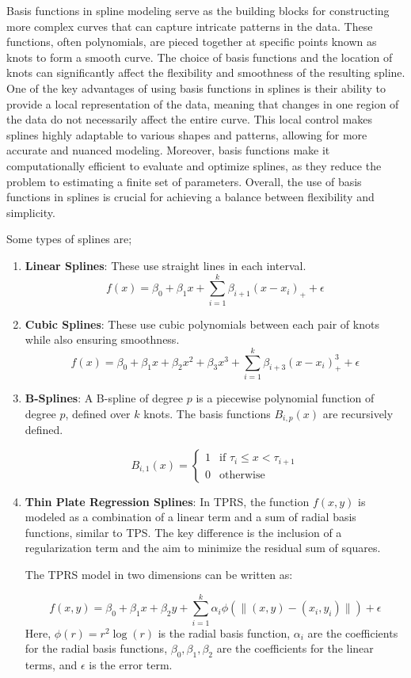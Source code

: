 \documentclass[12pt, twoside,hidelinks]{article}
\theoremstyle{definition}
\numberwithin{equation}{section}
\begin{document}
Basis functions in spline modeling serve as the building blocks for constructing more complex curves that can capture intricate patterns in the data. These functions, often polynomials, are pieced together at specific points known as knots to form a smooth curve. The choice of basis functions and the location of knots can significantly affect the flexibility and smoothness of the resulting spline. One of the key advantages of using basis functions in splines is their ability to provide a local representation of the data, meaning that changes in one region of the data do not necessarily affect the entire curve. This local control makes splines highly adaptable to various shapes and patterns, allowing for more accurate and nuanced modeling. Moreover, basis functions make it computationally efficient to evaluate and optimize splines, as they reduce the problem to estimating a finite set of parameters. Overall, the use of basis functions in splines is crucial for achieving a balance between flexibility and simplicity.
\newline

Some types of splines are;

\begin{enumerate}
    \item \textbf{Linear Splines}: These use straight lines in each interval.
    \[
    f(x) = \beta_0 + \beta_1 x + \sum_{i=1}^{k} \beta_{i+1} (x - x_i)_+ + \epsilon
    \]
    
    \item \textbf{Cubic Splines}: These use cubic polynomials between each pair of knots while also ensuring smoothness.
    \[
    f(x) = \beta_0 + \beta_1 x + \beta_2 x^2 + \beta_3 x^3 + \sum_{i=1}^{k} \beta_{i+3} (x - x_i)_+^3 + \epsilon
    \]

    \item \textbf{B-Splines}:
    A B-spline of degree \( p \) is a piecewise polynomial function of degree \( p \), defined over \( k \) knots. The basis functions \( B_{i,p}(x) \) are recursively defined.

    \[
    B_{i,1}(x) = 
    \begin{cases} 
    1 & \text{if } \tau_i \leq x < \tau_{i+1} \\
    0 & \text{otherwise}
    \end{cases}
    \]
    \item \textbf{Thin Plate Regression Splines}:
    In TPRS, the function \( f(x, y) \) is modeled as a combination of a linear term and a sum of radial basis functions, similar to TPS. The key difference is the inclusion of a regularization term and the aim to minimize the residual sum of squares.


The TPRS model in two dimensions can be written as:

\[
f(x, y) = \beta_0 + \beta_1 x + \beta_2 y + \sum_{i=1}^{k} \alpha_i \phi(\| (x, y) - (x_i, y_i) \|) + \epsilon
\]
Here, \( \phi(r) = r^2 \log(r) \) is the radial basis function, \( \alpha_i \) are the coefficients for the radial basis functions, \( \beta_0, \beta_1, \beta_2 \) are the coefficients for the linear terms, and \( \epsilon \) is the error term.
\end{enumerate}
\end{document}
